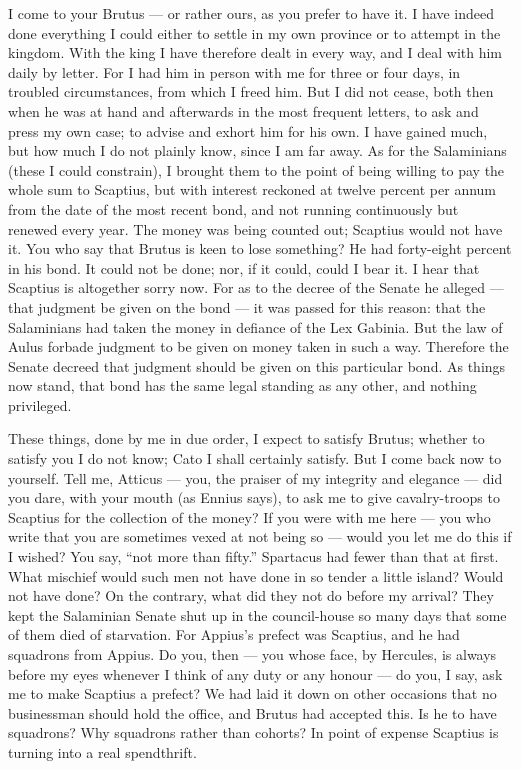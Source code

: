  I come to your Brutus --- or rather ours, as you prefer to have it. I have indeed done everything I could either to settle in my own province or to attempt in the kingdom. With the king I have therefore dealt in every way, and I deal with him daily by letter. For I had him in person with me for three or four days, in troubled circumstances, from which I freed him. But I did not cease, both then when he was at hand and afterwards in the most frequent letters, to ask and press my own case; to advise and exhort him for his own. I have gained much, but how much I do not plainly know, since I am far away. As for the Salaminians (these I could constrain), I brought them to the point of being willing to pay the whole sum to Scaptius, but with interest reckoned at twelve percent per annum from the date of the most recent bond, and not running continuously but renewed every year. The money was being counted out; Scaptius would not have it. You who say that Brutus is keen to lose something? He had forty-eight percent in his bond. It could not be done; nor, if it could, could I bear it. I hear that Scaptius is altogether sorry now. For as to the decree of the Senate he alleged --- that judgment be given on the bond --- it was passed for this reason: that the Salaminians had taken the money in defiance of the Lex Gabinia. But the law of Aulus forbade judgment to be given on money taken in such a way. Therefore the Senate decreed that judgment should be given on this particular bond. As things now stand, that bond has the same legal standing as any other, and nothing privileged.

 These things, done by me in due order, I expect to satisfy Brutus; whether to satisfy you I do not know; Cato I shall certainly satisfy. But I come back now to yourself. Tell me, Atticus --- you, the praiser of my integrity and elegance --- did you dare, with your mouth (as Ennius says), to ask me to give cavalry-troops to Scaptius for the collection of the money? If you were with me here --- you who write that you are sometimes vexed at not being so --- would you let me do this if I wished? You say, ``not more than fifty.'' Spartacus had fewer than that at first. What mischief would such men not have done in so tender a little island? Would not have done? On the contrary, what did they not do before my arrival? They kept the Salaminian Senate shut up in the council-house so many days that some of them died of starvation. For Appius's prefect was Scaptius, and he had squadrons from Appius. Do you, then --- you whose face, by Hercules, is always before my eyes whenever I think of any duty or any honour --- do you, I say, ask me to make Scaptius a prefect? We had laid it down on other occasions that no businessman should hold the office, and Brutus had accepted this. Is he to have squadrons? Why squadrons rather than cohorts? In point of expense Scaptius is turning into a real spendthrift.

